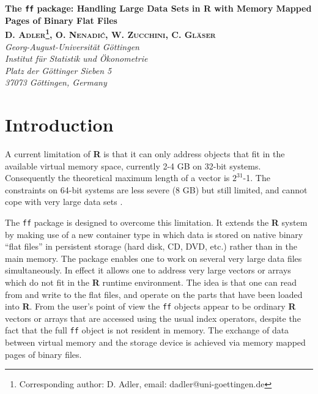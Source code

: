 \documentclass[12pt,a4paper]{article}
\begin{document}
 


\newcommand{\CPP}[1]{\emph{#1}}
\newcommand{\R}{\textbf{R}}
\newcommand{\rc}[1]{\texttt{#1}}
\newcommand{\ro}[1]{\texttt{\textsl{#1}}}



\begin{center}
\vspace{1.5 cm}
{\Large \textbf{The \texttt{ff} package: Handling Large Data Sets in R with Memory Mapped Pages of Binary Flat Files\\}} 
\vspace{1.0 cm} 
\textbf{\textsc{D. Adler\footnote{Corresponding author: D. Adler, email: dadler@uni-goettingen.de}, O. Nenadi{\'c}, W. Zucchini, C. Gl{\"a}ser\\}}
\vspace{0.5 cm}
\textsl{Georg-August-Universit{\"a}t G{\"o}ttingen\\ Institut f{\"u}r Statistik und {\"O}konometrie\\ Platz der G{\"o}ttinger Sieben 5\\ 37073 G{\"o}ttingen, Germany}
\end{center} 
\vspace{0.1cm} 

\section{Introduction}

A current limitation of \R{} \citep{R} is that it can only address objects that fit in the available virtual memory space, currently 2-4 GB on 32-bit systems. 
Consequently the theoretical maximum length of a vector is $2^{31}$-1.
The constraints on 64-bit systems are less severe (8 GB) but still limited, and cannot cope with very large data sets \citep{Radmin}. 

The \rc{ff} package is designed to overcome this limitation. 
It extends the \R{} system by making use of a new container type in which data is stored on native binary ``flat files'' in persistent storage (hard disk, CD, DVD, etc.) rather than in the main memory.
The package enables one to work on several very large data files simultaneously.
In effect it allows one to address very large vectors or arrays which do not fit in the \R{} runtime environment. 
The idea is that one can read from and write to the flat files, and operate on the parts that have been loaded into \R{}. 
From the user's point of view the \rc{ff} objects appear to be ordinary \R{} vectors or arrays that are accessed using the usual index operators, despite the fact that the full \rc{ff} object is not resident in memory. 
The exchange of data between virtual memory and the storage device is achieved via memory mapped pages of binary files.
\end{document}
